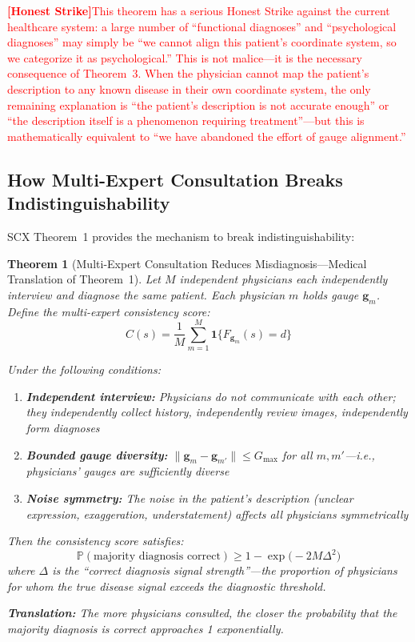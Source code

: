 \documentclass[12pt,a4paper]{article}
\newtheorem{theorem}{Theorem}[section]
\theoremstyle{remark}
\newcommand{\Pbb}{\mathbb{P}}
\newcommand{\honestcrit}[1]{%
    \textcolor{red}{\textbf{[Honest Strike]}#1}%
}
\newcommand{\assumptionRef}[1]{\textbf{A#1}}
\begin{document}
\honestcrit{This theorem has a serious Honest Strike against the current healthcare system: a large number of ``functional diagnoses'' and ``psychological diagnoses'' may simply be ``we cannot align this patient's coordinate system, so we categorize it as psychological.'' This is not malice---it is the necessary consequence of Theorem~3. When the physician cannot map the patient's description to any known disease in their own coordinate system, the only remaining explanation is ``the patient's description is not accurate enough'' or ``the description itself is a phenomenon requiring treatment''---but this is mathematically equivalent to ``we have abandoned the effort of gauge alignment.''}

\subsection{How Multi-Expert Consultation Breaks Indistinguishability}

SCX Theorem~1 provides the mechanism to break indistinguishability:

\begin{theorem}[Multi-Expert Consultation Reduces Misdiagnosis---Medical Translation of Theorem~1]\label{thm:multiexpert_medicine}
Let $M$ independent physicians each independently interview and diagnose the same patient. Each physician $m$ holds gauge $\mathbf{g}_m$. Define the multi-expert consistency score:
\begin{equation}
    C(s) = \frac{1}{M} \sum_{m=1}^{M} \mathbf{1}\{F_{\mathbf{g}_m}(s) = d\}
\end{equation}

Under the following conditions:
\begin{enumerate}[label=(\assumptionRef{\arabic*}),itemsep=2pt]
    \item \textbf{Independent interview:} Physicians do not communicate with each other; they independently collect history, independently review images, independently form diagnoses
    \item \textbf{Bounded gauge diversity:} $\|\mathbf{g}_m - \mathbf{g}_{m'}\| \leq G_{\max}$ for all $m, m'$---i.e., physicians' gauges are sufficiently diverse
    \item \textbf{Noise symmetry:} The noise in the patient's description (unclear expression, exaggeration, understatement) affects all physicians symmetrically
\end{enumerate}

Then the consistency score satisfies:
\begin{equation}
    \Pbb(\text{majority diagnosis correct}) \geq 1 - \exp\bigl(-2M \Delta^2\bigr)
\end{equation}
where $\Delta$ is the ``correct diagnosis signal strength''---the proportion of physicians for whom the true disease signal exceeds the diagnostic threshold.

\textbf{Translation:} The more physicians consulted, the closer the probability that the majority diagnosis is correct approaches 1 exponentially.
\end{theorem}
\end{document}
